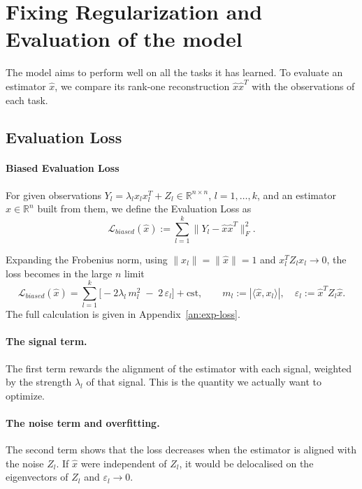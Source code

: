 \section{Fixing Regularization and Evaluation of the model}

The model aims to perform well on all the tasks it has learned. To evaluate an estimator $\hat{x}$, we compare
its rank-one reconstruction $\hat{x}\hat{x}^T$ with the observations of each task.

\subsection{Evaluation Loss}\label{sec:eval}

\paragraph{Biased Evaluation Loss}
For given observations $Y_l = \lambda_l x_l x_l^T + Z_l \in \mathbb{R}^{n\times n}$, $l = 1,\dots,k$, and an
estimator $\hat{x} \in \mathbb{R}^n$ built from them, we define the Evaluation Loss as
\begin{equation}
  \mathcal{L}_{biased}(\hat{x}) := \sum_{l=1}^{k} \big\| Y_l - \hat{x}\hat{x}^T \big\|_F^2 .
  \label{eq:train_loss_def}
\end{equation}

Expanding the Frobenius norm, using $\|x_l\| = \|\hat{x}\| = 1$ and $x_l^T Z_l x_l \to 0$, the loss becomes in
the large $n$ limit
\begin{equation}
  \mathcal{L}_{biased}(\hat{x}) = \sum_{l=1}^{k} \Big[ -2\lambda_l\, m_l^2 \;-\; 2\,\varepsilon_l \Big] + \mathrm{cst},
  \qquad
  m_l := |\langle \hat{x}, x_l \rangle|, \quad
  \varepsilon_l := \hat{x}^T Z_l \hat{x}.
  \label{eq:train_loss}
\end{equation}
The full calculation is given in Appendix~\ref{an:exp-loss}.

\paragraph{The signal term.} The first term rewards the alignment of the estimator with each signal, weighted
by the strength $\lambda_l$ of that signal. This is the quantity we actually want to optimize.

\paragraph{The noise term and overfitting.} The second term shows that the loss decreases when the estimator is aligned with the noise $Z_l$. If $\hat{x}$ were
independent of $Z_l$, it would be delocalised on the eigenvectors of $Z_l$ and
$\varepsilon_l \to  0$. 

